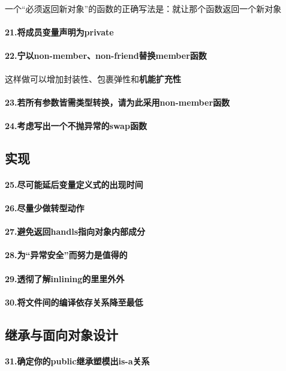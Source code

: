\documentclass[UTF8,a4paper,12pt]{ctexbook}
\begin{document}
			一个“必须返回新对象”的函数的正确写法是：就让那个函数返回一个新对象
		\paragraph{21.将成员变量声明为private}
		\paragraph{22.宁以non-member、non-friend替换member函数} 这样做可以增加封装性、包裹弹性和\textbf{机能扩充性}
		\paragraph{23.若所有参数皆需类型转换，请为此采用non-member函数}
		\paragraph{24.考虑写出一个不抛异常的swap函数}
	\subsection{实现}
		\paragraph{25.尽可能延后变量定义式的出现时间}
		\paragraph{26.尽量少做转型动作}
		\paragraph{27.避免返回handls指向对象内部成分}
		\paragraph{28.为“异常安全”而努力是值得的}
		\paragraph{29.透彻了解inlining的里里外外}
		\paragraph{30.将文件间的编译依存关系降至最低}
	\subsection{继承与面向对象设计}
		\paragraph{31.确定你的public继承塑模出is-a关系}
\end{document}
